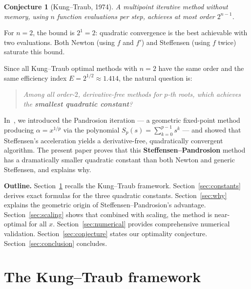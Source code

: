 \documentclass[10pt,a4paper,oneside]{book}
\newtheorem{conjecture}[theorem]{Conjecture}
\theoremstyle{definition}
\theoremstyle{remark}
\begin{document}
\begin{conjecture}[Kung--Traub, 1974]
\label{conj:kungtraub}
A multipoint iterative method without memory, using $n$ function evaluations per step, achieves at most order $2^{n-1}$.
\end{conjecture}

For $n = 2$, the bound is $2^1 = 2$: quadratic convergence is the best achievable with two evaluations.  Both Newton (using $f$ and $f'$) and Steffensen (using $f$ twice) saturate this bound.

\medskip

Since all Kung--Traub optimal methods with $n=2$ have the same order and the same efficiency index $E = 2^{1/2} \approx 1.414$, the natural question is:

\begin{quote}
\itshape Among all order-$2$, derivative-free methods for $p$-th roots, which achieves the \textbf{smallest quadratic constant}?
\end{quote}

In~\cite{besevic2026}, we introduced the Pandrosion iteration --- a geometric fixed-point method producing $\alpha = x^{1/p}$ via the polynomial $S_p(s) = \sum_{k=0}^{p-1} s^k$ --- and showed that Steffensen's acceleration yields a derivative-free, quadratically convergent algorithm.  The present paper proves that this \textbf{Steffensen--Pandrosion} method has a dramatically smaller quadratic constant than both Newton and generic Steffensen, and explains why.

\medskip

\textbf{Outline.}
Section~\ref{sec:framework} recalls the Kung--Traub framework.
Section~\ref{sec:constants} derives exact formulas for the three quadratic constants.
Section~\ref{sec:why} explains the geometric origin of Steffensen--Pandrosion's advantage.
Section~\ref{sec:scaling} shows that combined with scaling, the method is near-optimal for all $x$.
Section~\ref{sec:numerical} provides comprehensive numerical validation.
Section~\ref{sec:conjecture} states our optimality conjecture.
Section~\ref{sec:conclusion} concludes.

\section{The Kung--Traub framework}
\label{sec:framework}
\end{document}
